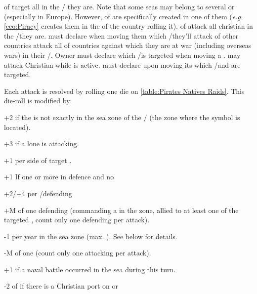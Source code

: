 \bparag \corsaire of  target all \TradeFLEET in the \STZ/\CTZ
they are.
\bparag Note that some seas may belong to several \STZ or \CTZ (especially in
Europe). However, \corsaire of  are specifically created in one
of them (\emph{e.g.} \ref{eco:Piracy} creates them in the \CTZ of the country
rolling it).
\bparag \corsaire of \Barbaresque attack all christian \TradeFLEET in the
\STZ/\CTZ they are. \TUR must declare when moving them which \STZ/\CTZ they'll
attack
\bparag \corsaire of other countries attack all \TradeFLEET of countries
against which they are at war (including overseas wars) in their
\STZ/\CTZ. Owner must declare which \STZ/\CTZ is targeted when moving a
\corsaire.
\bparag \TUR may attack Christian \TradeFLEET while
 is active. \TUR must declare upon moving its
\corsaire which \CTZ/\STZ and \TradeFLEET are targeted.

\bparag Each attack is resolved by rolling one die on \ref{table:Pirates
  Natives Raids}. This die-roll is modified by:
\begin{modlist}
\item[+2] if the \corsaire is not exactly in the sea zone of the \STZ/\CTZ
  (the zone where the symbol is located).
\item[+3] if a lone \corsaire\facemoins is attacking.
\item[+1] per side of target \TradeFLEET.
\item[+1] If one or more \ND in defence and no \FLEET
\item[+2/+4] per \FLEET\facemoins/\Faceplus defending
\item[+M] \Man of one defending \LeaderA (commanding a \FLEET in the zone,
  allied to at least one of the targeted \TradeFLEET, count only one defending
  \LeaderA per attack).
\item[-1] per year in the sea zone (max. ). See below for
  details.%
\item[-M] \Man of one \corsaire \LeaderA (count only one attacking \LeaderA
  per attack). %
\item[+1] if a naval battle occurred in the sea during this
  turn. %
\item[-2] \corsaire of  if there is a Christian port on
   or 
\end{modlist}

